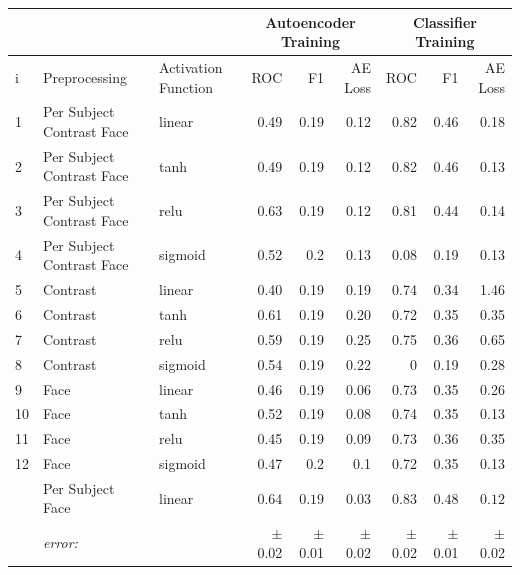           \begin{table}[!h] {\footnotesize
            \centering
          \begin{tabular}{lllrrrrrr}
                && &   \multicolumn{3}{|c|}{Autoencoder Training} &  \multicolumn{3}{c|}{Classifier Training}    \\
            \hline
             i&Preprocessing    & Activation Function&  ROC&F1&AE Loss & ROC & F1 & AE Loss \\
             \hline
             1&Per Subject Contrast Face & linear &    0.49 &   0.19 &     0.12 &    0.82 &   0.46 &     0.18 \\
             2&Per Subject Contrast Face & tanh   &    0.49 &   0.19 &     0.12 &    0.82 &   0.46 &     0.13 \\
             3&Per Subject Contrast Face & relu   &    0.63 &   0.19 &     0.12 &    0.81 &   0.44 &     0.14 \\
             4& Per Subject Contrast Face & sigmoid &    0.52 &   0.2  &     0.13 &    0.08 &   0.19 &     0.13 \\
             \hline
             5&Contrast          & linear &    0.40 &   0.19 &     0.19 &    0.74 &   0.34 &     1.46 \\
             6&Contrast          & tanh   &    0.61 &   0.19 &     0.20 &    0.72 &   0.35 &     0.35 \\
             7&Contrast          & relu   &    0.59 &   0.19 &     0.25 &    0.75 &   0.36 &     0.65 \\
             8& Contrast         & sigmoid &    0.54 &   0.19 &     0.22 &    0    &   0.19 &     0.28 \\
             \hline
             9&Face              & linear &    0.46 &   0.19 &     0.06 &    0.73 &   0.35 &     0.26 \\
             10&Face              & tanh   &    0.52 &   0.19 &     0.08 &    0.74 &   0.35 &     0.13 \\
             11&Face              & relu   &    0.45 &   0.19 &     0.09 &    0.73 &   0.36 &     0.35 \\
             12& Face             & sigmoid &    0.47 &   0.2  &     0.1  &    0.72 &   0.35 &     0.13 \\
             \hline
             \hdashline
             13&Per Subject Face  & linear &    $0.64$ &   $0.19$ &     $0.03$ &    $0.83$ &   $0.48$ &     $0.12$ \\
             &{\it error:}  &&$\pm$0.02 &$\pm$0.01 &$\pm$0.02  &$\pm$0.02 &$\pm$0.01 &$\pm$0.02 \\

\end{tabular}}
\end{table}
